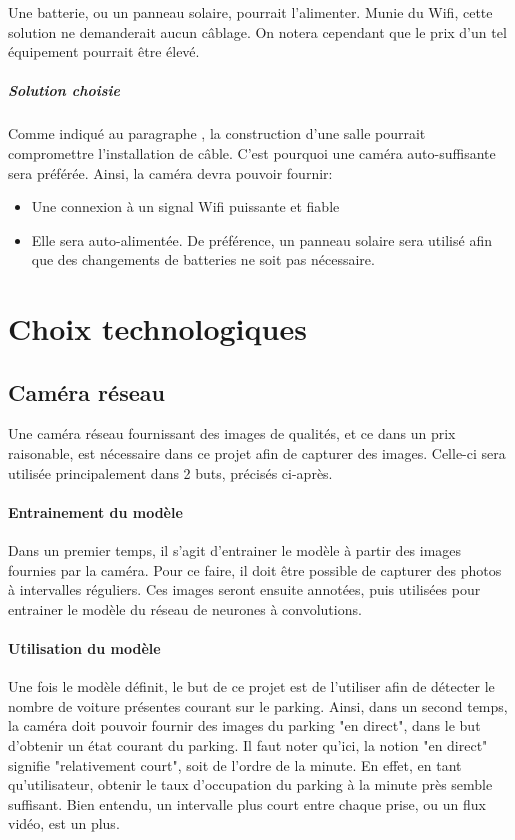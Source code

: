 Une batterie, ou un panneau solaire, pourrait l'alimenter. Munie du Wifi, cette solution ne demanderait aucun câblage. On notera cependant que le prix d'un tel équipement pourrait être élevé.

\subparagraph{Solution choisie}

Comme indiqué au paragraphe , la construction d'une salle pourrait compromettre l'installation de câble. C'est pourquoi une caméra auto-suffisante sera préférée. Ainsi, la caméra devra pouvoir fournir:
\begin{itemize}
    \item Une connexion à un signal Wifi puissante et fiable
    \item Elle sera auto-alimentée. De préférence, un panneau solaire sera utilisé afin que des changements de batteries ne soit pas nécessaire.
\end{itemize}


\section{Choix technologiques}

\subsection{Caméra réseau}\label{conception.techno.camera}
Une caméra réseau fournissant des images de qualités, et ce dans un prix raisonable, est nécessaire dans ce projet afin de capturer des images. Celle-ci sera utilisée principalement dans 2 buts, précisés ci-après.

\paragraph{Entrainement du modèle}
Dans un premier temps, il s'agit d'entrainer le modèle à partir des images fournies par la caméra. Pour ce faire, il doit être possible de capturer des photos à intervalles réguliers. Ces images seront ensuite annotées, puis utilisées pour entrainer le modèle du réseau de neurones à convolutions. 

\paragraph{Utilisation du modèle}
Une fois le modèle définit, le but de ce projet est de l'utiliser afin de détecter le nombre de voiture présentes courant sur le parking. Ainsi, dans un second temps, la caméra doit pouvoir fournir des images du parking "en direct", dans le but d'obtenir un état courant du parking. Il faut noter qu'ici, la notion "en direct" signifie "relativement court", soit de l'ordre de la minute. En effet, en tant qu'utilisateur, obtenir le taux d'occupation du parking à la minute près semble suffisant. Bien entendu, un intervalle plus court entre chaque prise, ou un flux vidéo, est un plus.

